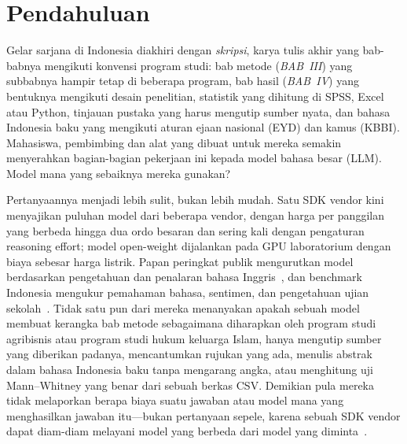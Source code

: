\section{Pendahuluan}
\label{sec:intro}

Gelar sarjana di Indonesia diakhiri dengan \emph{skripsi}, karya tulis akhir yang bab-babnya mengikuti konvensi program studi: bab metode (\emph{BAB~III}) yang subbabnya hampir tetap di beberapa program, bab hasil (\emph{BAB~IV}) yang bentuknya mengikuti desain penelitian, statistik yang dihitung di SPSS, Excel atau Python, tinjauan pustaka yang harus mengutip sumber nyata, dan bahasa Indonesia baku yang mengikuti aturan ejaan nasional (EYD) dan kamus (KBBI). Mahasiswa, pembimbing dan alat yang dibuat untuk mereka semakin menyerahkan bagian-bagian pekerjaan ini kepada model bahasa besar (LLM). Model mana yang sebaiknya mereka gunakan?

Pertanyaannya menjadi lebih sulit, bukan lebih mudah. Satu SDK vendor kini menyajikan puluhan model dari beberapa vendor, dengan harga per panggilan yang berbeda hingga dua ordo besaran dan sering kali dengan pengaturan reasoning effort; model open-weight dijalankan pada GPU laboratorium dengan biaya sebesar harga listrik. Papan peringkat publik mengurutkan model berdasarkan pengetahuan dan penalaran bahasa Inggris~\cite{hendrycks2021mmlu,liang2023helm}, dan benchmark Indonesia mengukur pemahaman bahasa, sentimen, dan pengetahuan ujian sekolah~\cite{wilie2020indonlu,koto2020indolem,winata2023nusax,koto2023indommlu,wang2024seaeval}. Tidak satu pun dari mereka menanyakan apakah sebuah model membuat kerangka bab metode sebagaimana diharapkan oleh program studi agribisnis atau program studi hukum keluarga Islam, hanya mengutip sumber yang diberikan padanya, mencantumkan rujukan yang ada, menulis abstrak dalam bahasa Indonesia baku tanpa mengarang angka, atau menghitung uji Mann--Whitney yang benar dari sebuah berkas CSV. Demikian pula mereka tidak melaporkan berapa biaya suatu jawaban atau model mana yang menghasilkan jawaban itu---bukan pertanyaan sepele, karena sebuah SDK vendor dapat diam-diam melayani model yang berbeda dari model yang diminta~\cite{arya2026paperagent}.

